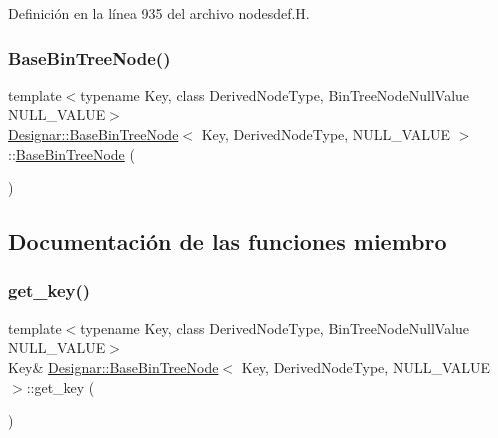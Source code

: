 Definición en la línea 935 del archivo nodesdef.\+H.

\mbox{\label{class_designar_1_1_base_bin_tree_node_a455b27b565e1dc004fd6292475d5a9de}} 
\subsubsection{\texorpdfstring{Base\+Bin\+Tree\+Node()}{BaseBinTreeNode()}\hspace{0.1cm}{\footnotesize\ttfamily [5/5]}}
{\footnotesize\ttfamily template$<$typename Key, class Derived\+Node\+Type, Bin\+Tree\+Node\+Null\+Value N\+U\+L\+L\+\_\+\+V\+A\+L\+UE$>$ \\
\hyperlink{class_designar_1_1_base_bin_tree_node}{Designar\+::\+Base\+Bin\+Tree\+Node}$<$ Key, Derived\+Node\+Type, N\+U\+L\+L\+\_\+\+V\+A\+L\+UE $>$\+::\hyperlink{class_designar_1_1_base_bin_tree_node}{Base\+Bin\+Tree\+Node} (\begin{DoxyParamCaption}\item[{const \hyperlink{class_designar_1_1_base_bin_tree_node}{Base\+Bin\+Tree\+Node}$<$ Key, Derived\+Node\+Type, N\+U\+L\+L\+\_\+\+V\+A\+L\+UE $>$ \&}]{ }\end{DoxyParamCaption})\hspace{0.3cm}{\ttfamily [delete]}}



\subsection{Documentación de las funciones miembro}
\mbox{\label{class_designar_1_1_base_bin_tree_node_a59c9489fff0bd46c058e901d02b2e582}} 
\subsubsection{\texorpdfstring{get\+\_\+key()}{get\_key()}\hspace{0.1cm}{\footnotesize\ttfamily [1/2]}}
{\footnotesize\ttfamily template$<$typename Key, class Derived\+Node\+Type, Bin\+Tree\+Node\+Null\+Value N\+U\+L\+L\+\_\+\+V\+A\+L\+UE$>$ \\
Key\& \hyperlink{class_designar_1_1_base_bin_tree_node}{Designar\+::\+Base\+Bin\+Tree\+Node}$<$ Key, Derived\+Node\+Type, N\+U\+L\+L\+\_\+\+V\+A\+L\+UE $>$\+::get\+\_\+key (\begin{DoxyParamCaption}{ }\end{DoxyParamCaption})\hspace{0.3cm}{\ttfamily [inline]}}



